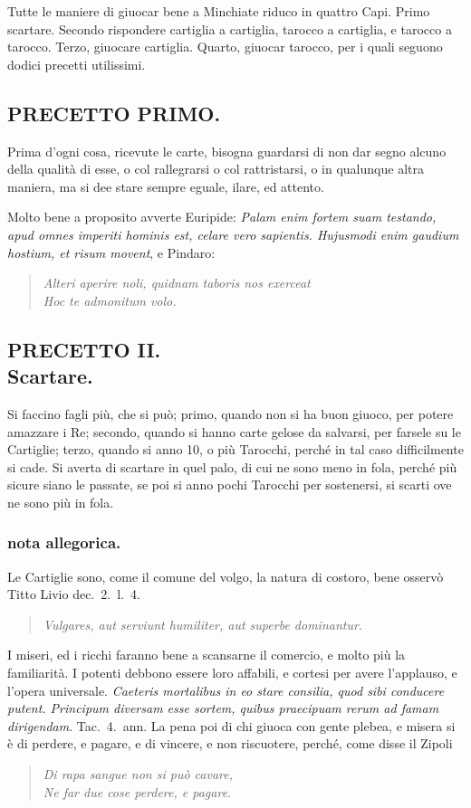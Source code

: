 \documentclass[11pt,a6paper]{article}
\newcommand{\literaryquote}[1]{%
\kern -6pt  \begin{verse}
    {\footnotesize \it #1}
  \end{verse}\kern -2pt%
}
\begin{document}
Tutte le maniere di giuocar bene a Minchiate
riduco in quattro Capi. Primo scartare.
Secondo rispondere cartiglia a cartiglia, tarocco
a cartiglia, e tarocco a tarocco. Terzo, giuocare
cartiglia. Quarto, giuocar tarocco, per i
quali seguono dodici precetti utilissimi.

\subsection{PRECETTO PRIMO.}

Prima d'ogni cosa, ricevute le carte, bisogna
guardarsi di non dar segno alcuno
della qualità di esse, o col rallegrarsi o col
rattristarsi, o in qualunque altra maniera,
ma si dee stare sempre eguale, ilare, ed attento.

{\footnotesize
 Molto bene a proposito avverte Euripide:
 \textit{Palam enim fortem suam testando,
apud omnes imperiti hominis est, celare vero
sapientis. Hujusmodi enim gaudium hostium, et risum movent}, e Pindaro:
\literaryquote{Alteri aperire noli, quidnam taboris nos exerceat\\
 Hoc te admonitum volo.}}


\subsection{PRECETTO II.\\
 \footnotesize Scartare.}
Si faccino fagli più, che si può; primo,
quando non si ha buon giuoco, per potere
amazzare i Re; secondo, quando si hanno
carte gelose da salvarsi, per farsele su le
Cartiglie; terzo, quando si anno 10, o più
Tarocchi, perché in tal caso difficilmente si
cade. Si averta di scartare in quel palo, di
cui ne sono meno in fola, perché più sicure
siano le passate, se poi si anno pochi Tarocchi
per sostenersi, si scarti ove ne sono più in
fola.

\subsubsection{nota allegorica.}
{\footnotesize

Le Cartiglie sono, come il comune del volgo,
la natura di costoro, bene osservò Titto Livio dec.\ 2.\ l.\ 4.
\literaryquote{Vulgares, aut serviunt humiliter, aut superbe dominantur.}

I miseri, ed i ricchi faranno bene
a scansarne il comercio, e molto più la familiarità.
I potenti debbono essere loro affabili, e cortesi per
avere l'applauso, e l'opera universale. \textit{Caeteris
mortalibus in eo stare consilia, quod sibi conducere
putent. Principum diversam esse sortem, quibus
praecipuam rerum ad famam dirigendam}. Tac.\ 4.\ ann.
La pena poi di chi giuoca con gente plebea, e
misera si è di perdere, e pagare, e di vincere, e non
riscuotere, perché, come disse il Zipoli
\literaryquote{Di rapa sangue non si può cavare, \\
Ne far due cose perdere, e pagare.}
}
\end{document}

